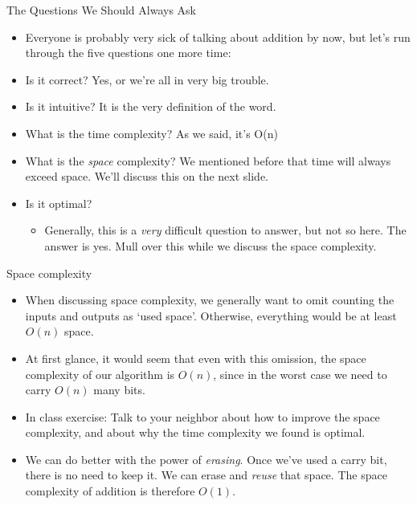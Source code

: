 \documentclass{beamer}
\begin{document}
\begin{frame}{The Questions We Should Always Ask}
    \begin{itemize}
        \item Everyone is probably very sick of talking about addition by now, but let's run through the five questions one more time:
        \pause
        \item Is it correct? Yes, or we're all in very big trouble.
        \pause
        \item Is it intuitive? It is the very definition of the word. 
        \pause
        \item What is the time complexity? As we said, it's O(n)
        \pause
        \item What is the \emph{space} complexity? We mentioned before that time will always exceed space. We'll discuss this on the next slide. 
        \pause
        \item Is it optimal? 
        \pause
        \begin{itemize}
             \item Generally, this is a \emph{very} difficult question to answer, but not so here. The answer is yes. Mull over this while we discuss the space complexity. 
        \end{itemize}
    \end{itemize}
\end{frame}

\begin{frame}{Space complexity}
    \begin{itemize}
        \item When discussing space complexity, we generally want to omit counting the inputs and outputs as `used space'. Otherwise, everything would be at least $O(n)$ space. 
        \item At first glance, it would seem that even with this omission, the space complexity of our algorithm is $O(n)$, since in the worst case we need to carry $O(n)$ many bits. 
        \item In class exercise: Talk to your neighbor about how to improve the space complexity, and about why the time complexity we found is optimal. 
            \pause
        \item We can do better with the power of \emph{erasing}. Once we've used a carry bit, there is no need to keep it. We can erase and \emph{reuse} that space. The space complexity of addition is therefore $O(1)$. 
    \end{itemize}
\end{frame}
\end{document}
